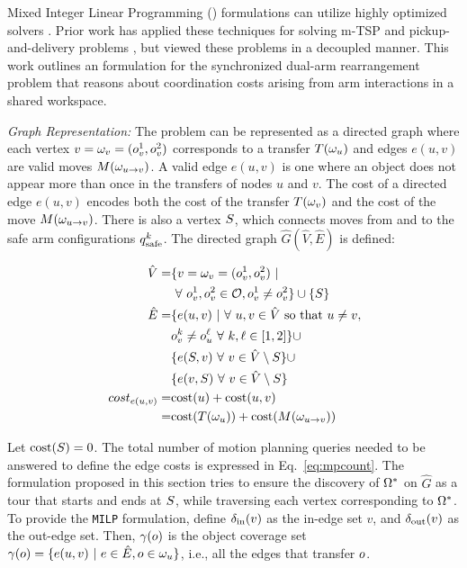 Mixed Integer Linear Programming (\milp) formulations can utilize highly optimized solvers \cite{gurobi}. Prior work has applied these techniques for solving m-TSP \cite{rathinam2006matroid,friggstad2013multiple} and pickup-and-delivery problems \cite{coltin2014multi,savelsbergh1995general}, but viewed these problems in a decoupled manner. This work outlines an \milp formulation for the synchronized dual-arm rearrangement problem that reasons about coordination costs arising from arm interactions in a shared workspace.

\textit{Graph Representation:}
The problem can be represented as a directed graph where each vertex $v = {\omega}_v = (o_v^1, o_v^2)$ corresponds to a transfer $ T({\omega}_u) $ and edges $e(u,v)$ are valid moves $M({\omega}_{u\rightarrow v})$. A valid edge $e(u,v)$ is one where an object does not appear more than once in the transfers of nodes $u$ and $v$.  The cost of a directed edge $e(u,v)$ encodes both the cost of the transfer  $ T({\omega}_v) $ and the cost of the move $M({\omega}_{u\rightarrow v})$. There is also a vertex $ S $, which connects moves from and to the safe arm configurations $q^k_{\rm safe}$.  The directed graph $ \hat{G} (\hat{V},\hat{E}) $ is defined:

\begin{align*}
\hspace{0.5in} \hat{V} =& \{ v = {\omega}_v = (o_v^1,o_v^2)\ |\\& \  \forall\ o_v^1,o_v^2 \in \mathcal{O}, o_v^1 \neq o_v^2 \} \cup \{S\}\\
\hat{E} =& \{  e(u,v)\ | \ \forall\ u,v\in \hat{V} \textrm{ so that } u\neq v,\ \\& 
o_v^k \neq o_u^{\ell}\ \forall\ k, \ell \in [1,2] \}
\cup\ \\&
 \{e(S,v)\ \forall\ v\in\hat{V}\setminus S\} \cup \\& \{e(v,S)\ \forall\ v\in\hat{V}\setminus S\}\\
cost_{e(u,v)} =& \textup{cost}(u) + \textup{cost}(u,v)\\ =&\textup{cost}(T({\omega}_u)) + \textup{cost}(M({\omega}_{u\rightarrow v}))
\end{align*}

Let $\textup{cost}(S) = 0$. The total number of motion planning queries needed to be answered to define the edge costs is expressed in Eq.~\ref{eq:mpcount}. The formulation proposed in this section tries to ensure the discovery of $ {{\Omega}}^* $ on $ \hat{G} $ as a tour that starts and ends at $ S $, while traversing each vertex corresponding to $ {{\Omega}}^* $. To provide the {\tt MILP} formulation, define $ \delta_{\rm in}(v) $ as the in-edge set $v$, and  $ \delta_{\rm out}(v) $ as the out-edge set. Then, $ \gamma(o) $ is the object coverage set $ \gamma(o) = \{ e(u,v) \ |\ e\in\hat{E}, o\in  {\omega}_u  \} $, i.e., all the edges that transfer $ o $.

